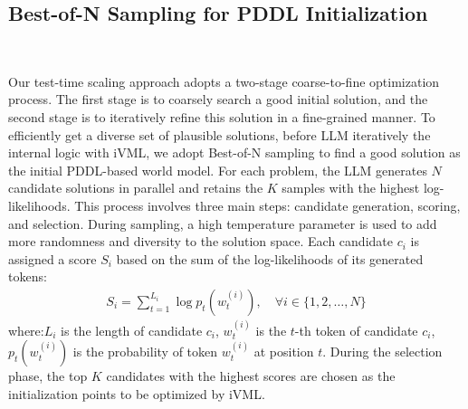 \subsection{Best-of-N Sampling for PDDL Initialization}
~\label{text:bon}
\vspace{-4mm}

Our test-time scaling approach adopts a two-stage coarse-to-fine optimization process. The first stage is to coarsely search a good initial solution, and the second stage is to iteratively refine this solution in a fine-grained manner.
To efficiently get a diverse set of plausible solutions, before LLM iteratively the internal logic with iVML, we adopt Best-of-N sampling to find a good solution as the initial PDDL-based world model. 
For each problem, the LLM generates $ N $ candidate solutions in parallel and retains the $ K $ samples with the highest log-likelihoods.
This process involves three main steps: candidate generation, scoring, and selection.
During sampling, a high temperature parameter is used to add more randomness and diversity to the solution space. 
Each candidate $ c_i $ is assigned a score $ S_i $ based on the sum of the log-likelihoods of its generated tokens:
\begin{align} \label{eq:bon}
S_i = \sum_{t=1}^{L_i} \log p_t\left(w_t^{(i)}\right), \quad \forall i \in \{1, 2, \dots, N\}
\end{align}
where:$ L_i $ is the length of candidate $ c_i $, $ w_t^{(i)} $ is the $ t $-th token of candidate $ c_i $, $ p_t\left(w_t^{(i)}\right) $ is the probability of token $ w_t^{(i)} $ at position $ t $.
During the selection phase, the top $ K $ candidates with the highest scores are chosen as the initialization points to be optimized by iVML. 

